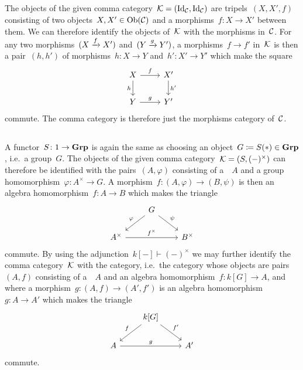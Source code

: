 \subsection{}

The objects of the given comma category~$\mathcal{K} = (\mathrm{Id}_{\mathcal{C}}, \mathrm{Id}_{\mathcal{C}})$ are tripels~$(X, X', f)$ consisting of two objects~$X, X' \in \operatorname{Ob}(\mathcal{C})$ and a morphisms~$f \colon X \to X'$ between them.
We can therefore identify the objects of~$\mathcal{K}$ with the morphisms in~$\mathcal{C}$.
For any two morphisms~$(X \xrightarrow{f} X')$ and~$(Y \xrightarrow{g} Y')$, a morphisms~$f \to f'$ in~$\mathcal{K}$ is then a pair~$(h,h')$ of morphisms~$h \colon X \to Y$ and~$h' \colon X' \to Y'$ which make the square
\[
  \begin{tikzcd}
      X
      \arrow{r}[above]{f}
      \arrow{d}[left]{h}
    & X'
      \arrow{d}[right]{h'}
    \\
      Y
      \arrow{r}[above]{g}
    & Y'
  \end{tikzcd}
\]
commute.
The comma category is therefore just the morphisms category of~$\mathcal{C}$.





\subsection{}

A functor~$S \colon 1 \to \mathbf{Grp}$ is again the same as choosing an object~$G \coloneqq S(\ast) \in \mathbf{Grp}$, i.e.\ a group~$G$.
The objects of the given comma category~$\mathcal{K} = (S, (-)^\times)$ can therefore be identified with the pairs~$(A,\varphi)$ consisting of a~{\kalg}~$A$ and a group homomorphism~$\varphi \colon A^\times \to G$.
A morphism~$f \colon (A, \varphi) \to (B, \psi)$ is then an algebra homomorphism~$f \colon A \to B$ which makes the triangle
\[
  \begin{tikzcd}
      {}
    & G
      \arrow{dl}[above left]{\varphi}
      \arrow{dr}[above right]{\psi}
    & {}
    \\
      A^\times
      \arrow{rr}[above]{f^\times}
    & {}
    & B^\times
  \end{tikzcd}
\]
commute.
By using the adjunction~$k[-] \vdash (-)^\times$ we may further identify the comma category~$\mathcal{K}$ with the  category, i.e.\ the category whose objects are pairs~$(A,f)$ consisting of a~{\kalg}~$A$ and an algebra homomorphism~$f \colon k[G] \to A$, and where a morphism~$g \colon (A,f) \to (A', f')$ is an algebra homomorphism~$g \colon A \to A'$ which makes the triangle
\[
  \begin{tikzcd}
      {}
    & k[G]
      \arrow{dl}[above left]{f}
      \arrow{dr}[above right]{f'}
    & {}
    \\
      A
      \arrow{rr}[above]{g}
    & {}
    & A'
  \end{tikzcd}
\]
commute.




